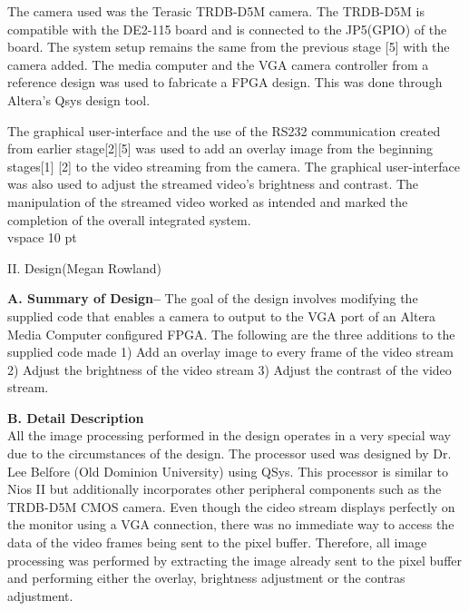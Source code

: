 \documentclass{article}
\begin{document}
\begin{multicols*}{2}
     The camera used was the Terasic TRDB-D5M camera. The TRDB-D5M is compatible with the DE2-115 board and is connected to the JP5(GPIO) of the board. The system setup remains the same from the previous stage [5] with the camera added. The media computer and the VGA camera controller from a reference design was used to fabricate a FPGA design. This was done through Altera's Qsys design tool. 

     The graphical user-interface and the use of the RS232 communication created from earlier stage[2][5] was used to add an overlay image from the beginning stages[1] [2]  to the video streaming from the camera. The graphical user-interface was also used to adjust the streamed video’s brightness and contrast. The manipulation of the streamed video worked as intended and marked the completion of the overall integrated system.\\

vspace {10 pt}
\begin{center}
\large{II. Design(Megan Rowland)}
\end{center}

{\bf A. Summary of Design--}  
The goal of the design involves modifying the supplied code that enables a camera to output to the VGA port of an Altera Media Computer configured FPGA. The following are the three additions to the supplied code made 1) Add an overlay image to every frame of the video stream 2) Adjust the brightness of the video stream 3) Adjust the contrast of the video stream.


{\bf B. Detail Description}\\
All the image processing performed in the design operates in a very special way due to the circumstances of the design. The processor used was designed by Dr. Lee Belfore (Old Dominion University) using QSys. This processor  is similar to Nios II but additionally incorporates other peripheral components such as the TRDB-D5M CMOS camera. Even though the cideo stream displays perfectly on the monitor using a VGA connection, there was no immediate way to access the data of the video frames being sent to the pixel buffer. Therefore, all image processing was performed by extracting the image already sent to the pixel buffer and performing either the overlay, brightness adjustment or the contras adjustment.\\


\end{multicols*}
\end{document}
